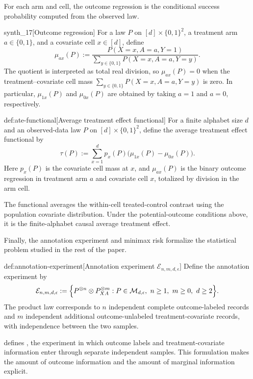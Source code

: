 For each arm and cell, the outcome regression  is the conditional success probability computed from the observed law.

\begin{definitionv}{synth_17}[Outcome regression]
For a law \(P\) on \([d]\times\{0,1\}^2\), a treatment arm \(a\in\{0,1\}\), and a covariate cell \(x\in[d]\), define
\[
\mu_{ax}(P)
:=
\frac{P(X=x,A=a,Y=1)}
{\sum_{y\in\{0,1\}} P(X=x,A=a,Y=y)} .
\]
The quotient is interpreted as total real division, so \(\mu_{ax}(P)=0\) when the treatment--covariate cell mass \(\sum_{y\in\{0,1\}}P(X=x,A=a,Y=y)\) is zero. In particular, \(\mu_{1x}(P)\) and \(\mu_{0x}(P)\) are obtained by taking \(a=1\) and \(a=0\), respectively.
\end{definitionv}

\begin{definitionv}{def:ate-functional}[Average treatment effect functional]
For a finite alphabet size \(d\) and an observed-data law \(P\) on \([d]\times\{0,1\}^2\), define the average treatment effect functional by
\[
\tau(P):=\sum_{x=1}^{d}p_x(P)\bigl(\mu_{1x}(P)-\mu_{0x}(P)\bigr).
\]
Here \(p_x(P)\) is the covariate cell mass at \(x\), and \(\mu_{ax}(P)\) is the binary outcome regression in treatment arm \(a\) and covariate cell \(x\), totalized by division in the arm cell.
\end{definitionv}

The functional  averages the within-cell treated-control contrast using the population covariate distribution. Under the potential-outcome conditions above, it is the finite-alphabet causal average treatment effect.

Finally, the annotation experiment and minimax risk formalize the statistical problem studied in the rest of the paper.

\begin{definitionv}{def:annotation-experiment}[Annotation experiment \(\mathcal E_{n,m,d,\epsilon}\)]
Define the annotation experiment by
\[
\mathcal E_{n,m,d,\epsilon}
:=
\Bigl\{
P^{\otimes n}\otimes P_{XA}^{\otimes m}:
P\in\mathcal M_{d,\epsilon},\ n\ge1,\ m\ge0,\ d\ge2
\Bigr\}.
\]
The product law corresponds to \(n\) independent complete outcome-labeled records and \(m\) independent additional outcome-unlabeled treatment-covariate records, with independence between the two samples.
\end{definitionv}

 defines , the experiment in which outcome labels and treatment-covariate information enter through separate independent samples. This formulation makes the amount of outcome information and the amount of marginal information explicit.

